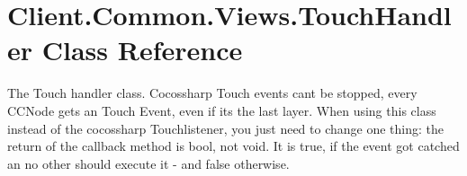 \hypertarget{classClient_1_1Common_1_1Views_1_1TouchHandler}{}\section{Client.\+Common.\+Views.\+Touch\+Handler Class Reference}
\label{classClient_1_1Common_1_1Views_1_1TouchHandler}


The Touch handler class. Cocossharp Touch events can\textquotesingle{}t be stopped, every C\+C\+Node gets an Touch Event, even if it\textquotesingle{}s the last layer. When using this class instead of the cocossharp Touchlistener, you just need to change one thing\+: the return of the callback method is bool, not void. It is true, if the event got catched an no other should execute it -\/ and false otherwise.  


